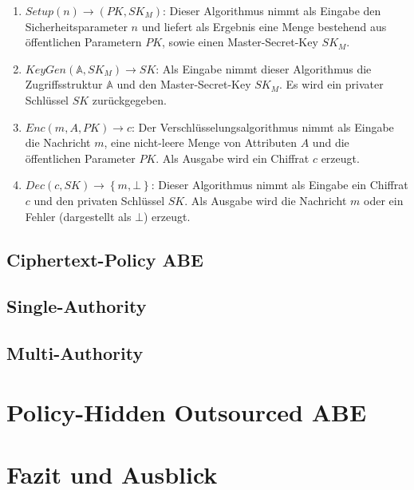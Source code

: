 \documentclass{hsflensburg}
\begin{document}
	\begin{enumerate}
		\item $\textit{Setup}\left(n\right) \to \left(PK, SK_M\right)$: Dieser
			Algorithmus nimmt als Eingabe den Sicherheitsparameter $n$ und liefert als
			Ergebnis eine Menge bestehend aus öffentlichen Parametern $PK$, sowie
			einen Master-Secret-Key $SK_M$.
		\item $\textit{KeyGen}\left(\mathbb{A}, SK_M\right) \to SK$: Als Eingabe
			nimmt dieser Algorithmus die Zu\-griffs\-struktur $\mathbb{A}$ und den
			Master-Secret-Key $SK_M$. Es wird ein privater Schlüssel $SK$
			zurückgegeben.
		\item $Enc\left(m, A, PK\right) \to c$: Der Verschlüsselungsalgorithmus
			nimmt als Eingabe die Nachricht $m$, eine nicht-leere Menge von Attributen
			$A$ und die öffentlichen Parameter $PK$. Als Ausgabe wird ein Chiffrat $c$
			erzeugt.
		\item $Dec\left(c, SK\right) \to \left\{m, \bot\right\}$: Dieser Algorithmus
			nimmt als Eingabe ein Chiffrat $c$ und den privaten Schlüssel $SK$. Als
			Ausgabe wird die Nachricht $m$ oder ein Fehler (dargestellt als $\bot$)
			erzeugt.
	\end{enumerate}

	\subsection{Ciphertext-Policy ABE}
	\subsection{Single-Authority}
	\subsection{Multi-Authority}

	\section{Policy-Hidden Outsourced ABE}
	\section{Fazit und Ausblick}

	\newpage
	
	
\end{document}
